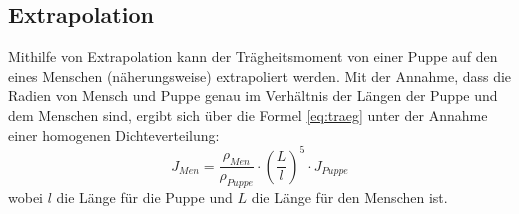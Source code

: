 \subsection{Extrapolation}
Mithilfe von Extrapolation kann der Trägheitsmoment von einer Puppe auf den eines Menschen (näherungsweise) extrapoliert werden. Mit der Annahme, dass die Radien von Mensch und Puppe genau im Verhältnis der Längen der Puppe und dem Menschen sind, ergibt sich über die Formel \ref{eq:traeg} unter der Annahme einer homogenen Dichteverteilung:
\begin{equation}
J_{Men} = \frac{\rho_{Men}}{\rho_{Puppe}} \cdot \left(\frac{L}{l}\right)^5 \cdot J_{Puppe}
\label{eq:int}
\end{equation}
wobei $l$ die Länge für die Puppe und $L$ die Länge für den Menschen ist.









